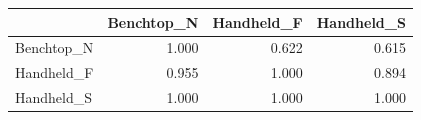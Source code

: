 \begin{tabular}{lrrr}
\toprule
 & Benchtop_N & Handheld_F & Handheld_S \\
\midrule
Benchtop_N & 1.000 & 0.622 & 0.615 \\
Handheld_F & 0.955 & 1.000 & 0.894 \\
Handheld_S & 1.000 & 1.000 & 1.000 \\
\bottomrule
\end{tabular}
